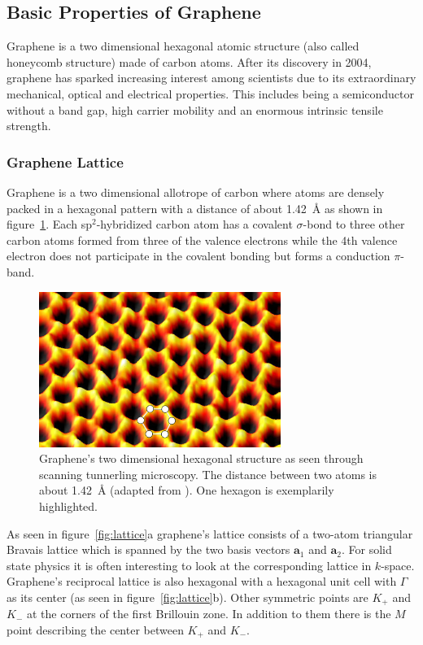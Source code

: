\subsection{Basic Properties of Graphene}

Graphene is a two dimensional hexagonal atomic structure (also called honeycomb structure) made of carbon atoms. After its discovery in 2004\cite{novoselov}, graphene has sparked increasing interest among scientists due to its extraordinary mechanical\cite{strength}, optical\cite{optical} and electrical\cite{carrier} properties. This includes being a semiconductor without a band gap\cite{Lherbier2012}, high carrier mobility\cite{carrier} and an enormous intrinsic tensile strength\cite{strength}.

\subsubsection{Graphene Lattice}

Graphene is a two dimensional allotrope of carbon where atoms are densely packed in a hexagonal pattern with a distance of about \SI{1.42}{\angstrom} as shown in figure~\ref{fig:spm}. Each sp$^2$-hybridized carbon atom has a covalent $\sigma$-bond to three other carbon atoms formed from three of the valence electrons while the 4th valence electron does not participate in the covalent bonding but forms a conduction $\pi$-band.

\begin{figure}[!h]
  \centering
  \includegraphics[width=0.7\textwidth]{./images/graphene-spm.png}
  \caption{Graphene's two dimensional hexagonal structure as seen through scanning tunnerling microscopy. The distance between two atoms is about \SI{1.42}{\angstrom} (adapted from \cite{graphene-spm}). One hexagon is exemplarily highlighted.}
  \label{fig:spm}
\end{figure}

As seen in figure~\ref{fig:lattice}a graphene's lattice consists of a two-atom triangular Bravais lattice which is spanned by the two basis vectors $\mathbf{a}_1$ and $\mathbf{a}_2$. For solid state physics it is often interesting to look at the corresponding lattice in $k$-space. Graphene's reciprocal lattice is also hexagonal with a hexagonal unit cell with $\Gamma$ as its center (as seen in figure~\ref{fig:lattice}b). Other symmetric points are $K_+$ and $K_-$ at the corners of the first Brillouin zone. In addition to them there is the $M$ point describing the center between $K_+$ and $K_-$.

